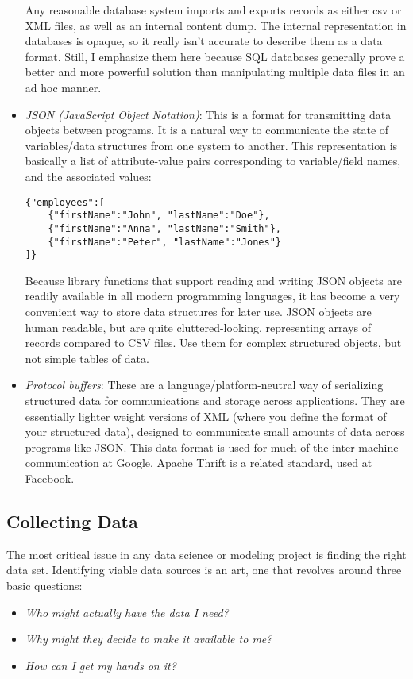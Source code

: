\documentclass[10pt]{article}
\begin{document}
\begin{itemize}
Any reasonable database system imports and exports records as either csv or XML files, as well as an internal content dump. The internal representation in databases is opaque, so it really isn't accurate to describe them as a data format. Still, I emphasize them here because SQL databases generally prove a better and more powerful solution than manipulating multiple data files in an ad hoc manner.
  \item \textit{JSON (JavaScript Object Notation)}: This is a format for transmitting data objects between programs. It is a natural way to communicate the state of variables/data structures from one system to another. This representation is basically a list of attribute-value pairs corresponding to variable/field names, and the associated values:
\begin{verbatim}
{"employees":[
    {"firstName":"John", "lastName":"Doe"},
    {"firstName":"Anna", "lastName":"Smith"},
    {"firstName":"Peter", "lastName":"Jones"}
]}
\end{verbatim}
Because library functions that support reading and writing JSON objects are readily available in all modern programming languages, it has become a very convenient way to store data structures for later use. JSON objects are human readable, but are quite cluttered-looking, representing arrays of records compared to CSV files. Use them for complex structured objects, but not simple tables of data.
  \item \textit{Protocol buffers}: These are a language/platform-neutral way of serializing structured data for communications and storage across applications. They are essentially lighter weight versions of XML (where you define the format of your structured data), designed to communicate small amounts of data across programs like JSON. This data format is used for much of the inter-machine communication at Google. Apache Thrift is a related standard, used at Facebook.
\end{itemize}

\subsection{Collecting Data}
The most critical issue in any data science or modeling project is finding the right data set. Identifying viable data sources is an art, one that revolves around three basic questions:

\begin{itemize}
  \item \textit{Who might actually have the data I need?}
  \item \textit{Why might they decide to make it available to me?}
  \item \textit{How can I get my hands on it?}
\end{itemize}
\end{document}

